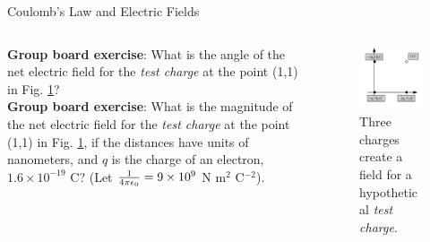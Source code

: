 \documentclass{beamer}
\begin{document}
\begin{frame}{Coulomb’s Law and Electric Fields}
\small
\begin{columns}[T]
\begin{column}{0.5\textwidth}
\textbf{Group board exercise}: What is the angle of the net electric field for the \textit{test charge} at the point (1,1) in Fig. \ref{fig:netfield1}? \\ \vspace{0.5cm}
\textbf{Group board exercise}: What is the magnitude of the net electric field for the \textit{test charge} at the point (1,1) in Fig. \ref{fig:netfield1}, if the distances have units of nanometers, and $q$ is the charge of an electron, $1.6\times 10^{-19}$ C? (Let $\frac{1}{4\pi\epsilon_{\rm 0}} = 9\times 10^{9}$ N m$^2$ C$^{-2}$).\\ \vspace{0.5cm}
\end{column}
\begin{column}{0.5\textwidth}
\begin{figure}
\includegraphics[width=\textwidth]{figures/NetField1.pdf}
\caption{\label{fig:netfield1} Three charges create a field for a hypothetical \textit{test charge}.}
\end{figure}
\end{column}
\end{columns}
\end{frame}
\end{document}
